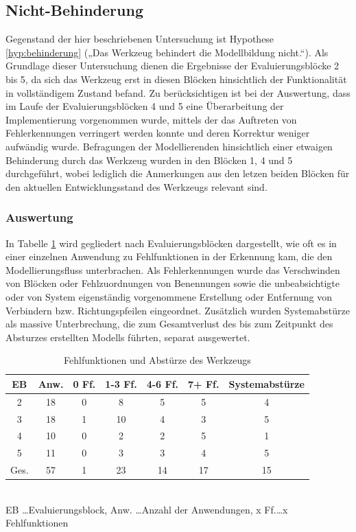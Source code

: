 
\subsection{Nicht-Behinderung} %
\label{sub:nicht_behinderung}

Gegenstand der hier beschriebenen Untersuchung ist Hypothese \ref{hyp:behinderung} („Das Werkzeug behindert die Modellbildung nicht.“). Als Grundlage dieser Untersuchung dienen die Ergebnisse der Evaluierungsblöcke 2 bis 5, da sich das Werkzeug erst in diesen Blöcken hinsichtlich der Funktionalität in vollständigem Zustand befand. Zu berücksichtigen ist bei der Auswertung, dass im Laufe der Evaluierungsblöcken 4 und 5 eine Überarbeitung der Implementierung vorgenommen wurde, mittels der das Auftreten von Fehlerkennungen verringert werden konnte und deren Korrektur weniger aufwändig wurde. Befragungen der Modellierenden hinsichtlich einer etwaigen Behinderung durch das Werkzeug wurden in den Blöcken 1, 4 und 5 durchgeführt, wobei lediglich die Anmerkungen aus den letzen beiden Blöcken für den aktuellen Entwicklungsstand des Werkzeugs relevant sind.

\subsubsection{Auswertung} 

In Tabelle \ref{tab:fehlfunktionen} wird gegliedert nach Evaluierungsblöcken dargestellt, wie oft es in einer einzelnen Anwendung zu Fehlfunktionen in der Erkennung kam, die den Modellierungsfluss unterbrachen. Als Fehlerkennungen wurde das Verschwinden von Blöcken oder Fehlzuordnungen von Benennungen sowie die unbeabsichtigte oder von System eigenständig vorgenommene Erstellung oder Entfernung von Verbindern bzw. Richtungspfeilen eingeordnet. Zusätzlich wurden Systemabstürze als massive Unterbrechung, die zum Gesamtverlust des bis zum Zeitpunkt des Absturzes erstellten Modells führten, separat ausgewertet.

\begin{table}[htbp]
	\centering
	\caption{Fehlfunktionen und Abstürze des Werkzeugs}
\begin{tabular}{| c || c || c | c | c | c || c |}
  \hline
   EB    & Anw. & 0 Ff. & 1-3 Ff. & 4-6 Ff. & 7+ Ff. & Systemabstürze \\ \hline
   2     & 18 & 0 &  8 &  5 &  5 &  4 \\ 
   3     & 18 & 1 & 10 &  4 &  3 &  5 \\ 
   4     & 10 & 0 &  2 &  2 &  5 &  1 \\ 
   5     & 11 & 0 &  3 &  3 &  4 &  5 \\ \hline
   Ges.  & 57 & 1 & 23 & 14 & 17 & 15 \\ \hline
\end{tabular} \\
\footnotesize EB \ldots Evaluierungsblock, Anw. \ldots Anzahl der Anwendungen, x Ff.\ldots x Fehlfunktionen
	\label{tab:fehlfunktionen}
\end{table}

